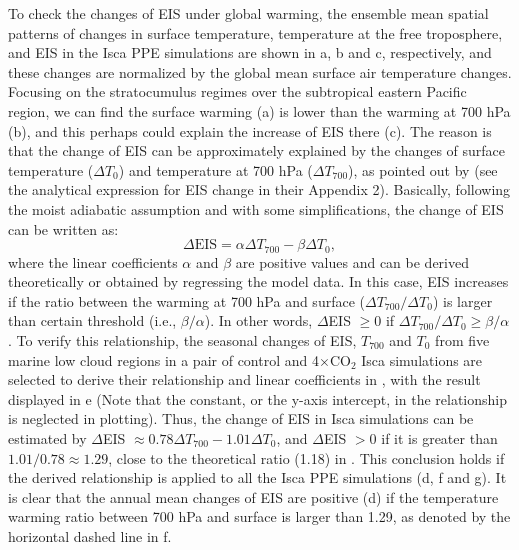 To check the changes of EIS under global warming, the ensemble mean spatial patterns of changes in surface temperature, temperature at the free troposphere, and EIS in the Isca PPE simulations are shown in a, b and c, respectively, and these changes are normalized by the global mean surface air temperature changes. Focusing on the stratocumulus regimes over the subtropical eastern Pacific region, we can find the surface warming (a) is lower than the warming at 700 hPa (b), and this perhaps could explain the increase of EIS there (c). The reason is that the change of EIS can be approximately explained by the changes of surface temperature ($\Delta T_0$) and temperature at 700 hPa ($\Delta T_{700}$), as pointed out by \cite{Qu2014} (see the analytical expression for EIS change in their Appendix 2). Basically, following the moist adiabatic assumption and with some simplifications, the change of EIS can be written as:
\begin{equation}
    \Delta\text{EIS} =\alpha \Delta T_{700} - \beta \Delta T_0,
    \label{eq:eis_change_T0_T700}
\end{equation}
where the linear coefficients $\alpha$ and $\beta$ are positive values and can be derived theoretically or obtained by regressing the model data. In this case, EIS increases if the ratio between the warming at 700 hPa and surface ($\Delta T_{700}/\Delta T_0$) is larger than certain threshold (i.e., $\beta/\alpha$). In other words, $\Delta$EIS $\geq 0$ if $\Delta T_{700}/\Delta T_0\geq \beta/\alpha$. To verify this relationship, the seasonal changes of EIS, $T_{700}$ and $T_{0}$ from five marine low cloud regions \citep{Klein1993,Qu2014} in a pair of control and 4$\times$CO$_2$ Isca simulations are selected to derive their relationship and linear coefficients in , with the result displayed in e (Note that the constant, or the y-axis intercept, in the relationship is neglected in plotting). Thus, the change of EIS in Isca simulations can be estimated by $\Delta$EIS $\approx 0.78\Delta T_{700} - 1.01\Delta T_0$, and $\Delta$EIS $>0$ if it is greater than $1.01/0.78\approx1.29$, close to the theoretical ratio (1.18) in \cite{Qu2014}. This conclusion holds if the derived relationship is applied to all the Isca PPE simulations (d, f and g). It is clear that the annual mean changes of EIS are positive (d) if the temperature warming ratio between 700 hPa and surface is larger than 1.29, as denoted by the horizontal dashed line in f.

